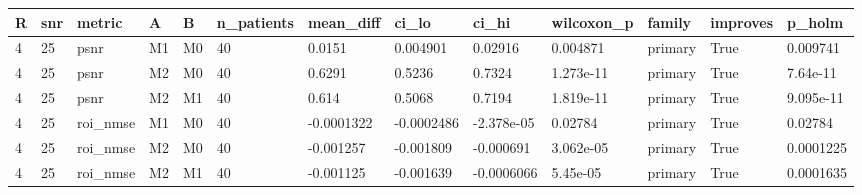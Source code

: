 \begin{tabular}{lllllllllllll}
\hline
R & snr & metric & A & B & n\_patients & mean\_diff & ci\_lo & ci\_hi & wilcoxon\_p & family & improves & p\_holm \\
\hline
4 & 25 & psnr & M1 & M0 & 40 & 0.0151 & 0.004901 & 0.02916 & 0.004871 & primary & True & 0.009741 \\
4 & 25 & psnr & M2 & M0 & 40 & 0.6291 & 0.5236 & 0.7324 & 1.273e-11 & primary & True & 7.64e-11 \\
4 & 25 & psnr & M2 & M1 & 40 & 0.614 & 0.5068 & 0.7194 & 1.819e-11 & primary & True & 9.095e-11 \\
4 & 25 & roi\_nmse & M1 & M0 & 40 & -0.0001322 & -0.0002486 & -2.378e-05 & 0.02784 & primary & True & 0.02784 \\
4 & 25 & roi\_nmse & M2 & M0 & 40 & -0.001257 & -0.001809 & -0.000691 & 3.062e-05 & primary & True & 0.0001225 \\
4 & 25 & roi\_nmse & M2 & M1 & 40 & -0.001125 & -0.001639 & -0.0006066 & 5.45e-05 & primary & True & 0.0001635 \\
\hline
\end{tabular}
